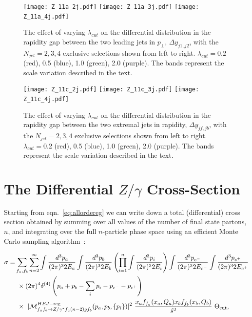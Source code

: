	\begin{figure}[H]
		\centering
		\texttt{[image: Z\_11a\_2j.pdf]}\hfill
		\texttt{[image: Z\_11a\_3j.pdf]}\hfill
		\texttt{[image: Z\_11a\_4j.pdf]}
		\caption{The effect of varying $\lambda_{cut}$ on the differential distribution
		in the rapidity gap between the two leading jets in $p_\perp$, $\Delta y_{j1, j2}$,
		with the $N_{jet}=2,3,4$ exclusive selections shown from left to right.
		$\lambda_{cut}=0.2$ (red), 0.5 (blue), 1.0 (green), 2.0 (purple).
		The bands represent the scale variation described in the text.}
		\label{fig:lambdadist}
	\end{figure}

	\begin{figure}[H]
		\centering
		\texttt{[image: Z\_11c\_2j.pdf]}\hfill
		\texttt{[image: Z\_11c\_3j.pdf]}\hfill
		\texttt{[image: Z\_11c\_4j.pdf]}
		\caption{The effect of varying $\lambda_{cut}$ on the differential distribution
		in the rapidity gap between the two extremal jets in rapidity, $\Delta y_{jf, jb}$,
		with the $N_{jet}=2,3,4$ exclusive selections shown from left to right.
		$\lambda_{cut}=0.2$ (red), 0.5 (blue), 1.0 (green), 2.0 (purple).
		The bands represent the scale variation described in the text.}
		\label{fig:lambdadistdy}
	\end{figure}

\section{The Differential ${Z/\gamma}$ Cross-Section}

	Starting from eqn.~\eqref{eq:allordereg} we can write down a total (differential)
	cross section obtained by summing over all values of the number of final state partons, $n$, and
	integrating over the full $n$-particle phase space using an efficient Monte
	Carlo sampling algorithm~\cite{Andersen:2008ue,Andersen:2008gc}:

	\begin{align}
	  \label{eq:sigma}
	  \begin{split}
	    \sigma =& \sum_{f_a,f_b} \sum_{n=2}^\infty \int \frac{d^3 p_a}{(2\pi)^3 2E_a} \int \frac{d^3
	      p_b}{(2\pi)^3 2E_b}  \left( \prod_{i=1}^n \int \frac{d^3 p_i}{(2\pi)^3
	        2E_i} \right) \int \frac{d^3 p_{e^-}}{(2\pi)^3 2E_{e^-}} \int \frac{d^3 p_{e^+}}{(2\pi)^3 2E_{e^+}} \\
	    & \ \times (2\pi)^4 \delta^{(4)}\left(p_a+p_b -\sum_i p_i - p_{e^-} -p_{e^+}\right) \\
	    & \ \times \ |\mathcal{M}^{HEJ-{\rm reg}}_{f_af_b\to Z/\gamma^*
	      f_a(n-2)gf_b}(p_a,p_b,\{p_i\})|^2 \ \frac{ x_a f_{f_a}(x_a, Q_a) x_b
	      f_{f_b}(x_b,Q_b)}{\hat s^2}\ \Theta_{\rm cut},
	  \end{split}
	\end{align}

